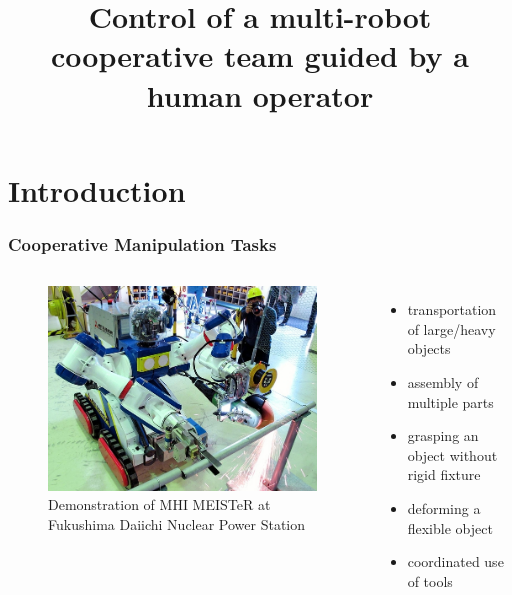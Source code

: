 \documentclass[student]{ITRslides}
\title{Control of a multi-robot cooperative team guided by a human operator}
\begin{document}
\begin{frame}
    \titlepage
\end{frame}


\section{Introduction}

\begin{frame}
	\frametitle{Cooperative Manipulation Tasks}
		\begin{columns}
			\begin{figure}[htb]
			\centering
			\includegraphics[width=0.98\textwidth]{mhi-meister45.jpg}
			\caption{Demonstration of MHI MEISTeR at 						Fukushima Daiichi 					Nuclear 						Power Station\cite{}}
			\end{figure} 
			\begin{itemize}
				\item transportation of large/heavy objects
	\item assembly of multiple parts 
	\item grasping an object without rigid fixture 
	\item deforming a flexible object
	\item coordinated use of tools
			\end{itemize}
			\end{columns}
\end{frame}
\end{document}
